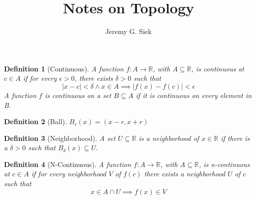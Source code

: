 \documentclass{article}
\title{Notes on Topology}
\author{Jeremy G. Siek}
\newtheorem{definition}{Definition}%
\newcommand{\Reals}[0]{\mathbb{R}}
\begin{document}
\maketitle

\begin{definition}[Continuous]
  A function $f : A \to \Reals$, with $A \subseteq \Reals$,
  is continuous at $c \in A$ if for every $\epsilon > 0$,
  there exists $\delta > 0$ such that
  \[
    |x - c| < \delta \land x \in A \implies |f(x) - f(c)| < \epsilon
  \]
  A function $f$ is continuous on a set $B \subseteq A$ if it is
  continuous on every element in B.
\end{definition}

\begin{definition}[Ball]
  $B_r(x) = (x-r,x+r)$
\end{definition}

\begin{definition}[Neighborhood]
  A set $U \subseteq \Reals$ is a neighborhood of $x \in \Reals$
  if there is a $\delta > 0$ such that $B_\delta(x) \subseteq U$.
\end{definition}


\begin{definition}[N-Continuous]
  A function $f : A \to \Reals$, with $A \subseteq \Reals$,
  is n-continuous at $c \in A$ if for every neighborhood
  $V$ of $f(c)$ there exists a neighborhood $U$ of $c$
  such that
  \[
    x \in A \cap U \implies f(x) \in V
  \]
\end{definition}
\end{document}
